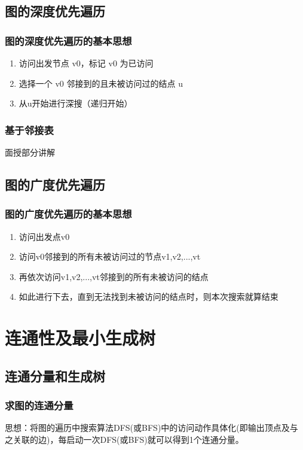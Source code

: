 \documentclass[AutoFakeBold]{LZUThesis2007}
\begin{document}
		\subsection{图的深度优先遍历}
			\subsubsection{图的深度优先遍历的基本思想}
			\begin{enumerate}
				\item 访问出发节点 v0，标记 v0 为已访问
				\item 选择一个 v0 邻接到的且未被访问过的结点 u
				\item 从u开始进行深搜（递归开始）
			\end{enumerate}
			\subsubsection{基于邻接表}
			面授部分讲解

		\subsection{图的广度优先遍历}
			\subsubsection{图的广度优先遍历的基本思想}
			\begin{enumerate}
				\item 访问出发点v0
				\item 访问v0邻接到的所有未被访问过的节点v1,v2,...,vt
				\item 再依次访问v1,v2,...,vt邻接到的所有未被访问的结点
				\item 如此进行下去，直到无法找到未被访问的结点时，则本次搜索就算结束
			\end{enumerate}
	\section{连通性及最小生成树}
		\subsection{连通分量和生成树}
			\subsubsection{求图的连通分量}
			思想：将图的遍历中搜索算法DFS(或BFS)中的访问动作具体化(即输出顶点及与之关联的边)，每启动一次DFS(或BFS)就可以得到1个连通分量。
\end{document}
